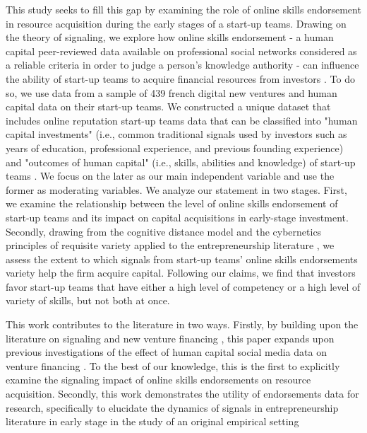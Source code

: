 \documentclass[12pt]{article}
\begin{document}
This study seeks to fill this gap by examining the role of online skills endorsement in resource acquisition during the early stages of a start-up teams. Drawing on the theory of signaling, we explore how online skills endorsement - a human capital peer-reviewed data available on professional social networks considered as a reliable criteria in order to judge a person’s knowledge authority - can influence the ability of start-up teams to acquire financial resources from investors \citep{rapanta2017linkedin}. To do so, we use data from a sample of 439 french digital new ventures and human capital data on their start-up teams. We constructed a unique dataset that includes online reputation start-up teams data that can be classified into "human capital investments" (i.e., common traditional signals used by investors such as years of education, professional experience, and previous founding experience) and "outcomes of human capital" (i.e., skills, abilities and knowledge) of start-up teams \citep{marvel2016human}. We focus on the later as our main independent variable and use the former as moderating variables. We analyze our statement in two stages. First, we examine the relationship between the level of online skills endorsement of start-up teams and its impact on capital acquisitions in early-stage investment. Secondly, drawing from the cognitive distance model \citep{nooteboom2007optimal} and the cybernetics principles of requisite variety applied to the entrepreneurship literature \citep{ashby1957introduction, harrison2007s, sundermeier2022entrepreneurial}, we assess the extent to which signals from start-up teams' online skills endorsements variety help the firm acquire capital. Following our claims, we find that investors favor  start-up teams that have either a high level of competency or a high level of variety of skills, but not both at once.

This work contributes to the literature in two ways. Firstly, by building upon the literature on signaling and new venture financing \citep{colombo2021use, drover2017review, klein2020start}, this paper expands upon previous investigations of the effect of human capital social media data on venture financing \citep{banerji2019startup, marvel2016human, mollick2014dynamics, reese2020should}. To the best of our knowledge, this is the first to explicitly examine the signaling impact of online skills endorsements on resource acquisition. Secondly, this work demonstrates the utility of endorsements data for research, specifically to elucidate the dynamics of signals in entrepreneurship literature in early stage in the study of an original empirical setting \citep{perez2016endorsement, gasiorowski2022pay}
\end{document}
